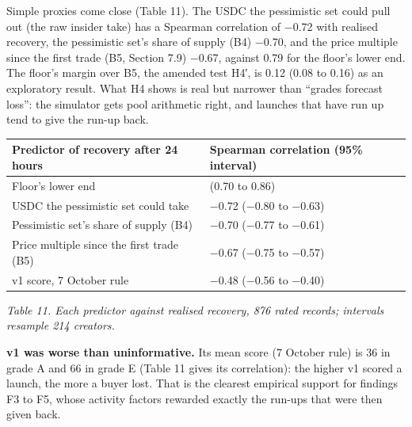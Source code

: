 Simple proxies come close (Table 11). The USDC the pessimistic set could pull out (the raw insider take) has a Spearman correlation of −0.72 with realised recovery, the pessimistic set's share of supply (B4) −0.70, and the price multiple since the first trade (B5, Section 7.9) −0.67, against 0.79 for the floor's lower end. The floor's margin over B5, the amended test H4′, is 0.12 (0.08 to 0.16) as an exploratory result. What H4 shows is real but narrower than ``grades forecast loss'': the simulator gets pool arithmetic right, and launches that have run up tend to give the run-up back.

{\def\LTcaptype{none} %
\begin{longtable}[]{@{}
  >{\raggedright\arraybackslash}p{}
  >{\raggedright\arraybackslash}p{}@{}}
\toprule\noalign{}
\begin{minipage}[b]{\linewidth}\raggedright
Predictor of recovery after 24 hours
\end{minipage} & \begin{minipage}[b]{\linewidth}\raggedright
Spearman correlation (95\% interval)
\end{minipage} \\
\midrule\noalign{}
\endhead
\bottomrule\noalign{}
\endlastfoot
Floor's lower end & 0.79 (0.70 to 0.86) \\
USDC the pessimistic set could take & −0.72 (−0.80 to −0.63) \\
Pessimistic set's share of supply (B4) & −0.70 (−0.77 to −0.61) \\
Price multiple since the first trade (B5) & −0.67 (−0.75 to −0.57) \\
v1 score, 7 October rule & −0.48 (−0.56 to −0.40) \\
\end{longtable}
}

\emph{Table 11. Each predictor against realised recovery, 876 rated records; intervals resample 214 creators.}

\textbf{v1 was worse than uninformative.} Its mean score (7 October rule) is 36 in grade A and 66 in grade E (Table 11 gives its correlation): the higher v1 scored a launch, the more a buyer lost. That is the clearest empirical support for findings F3 to F5, whose activity factors rewarded exactly the run-ups that were then given back.

